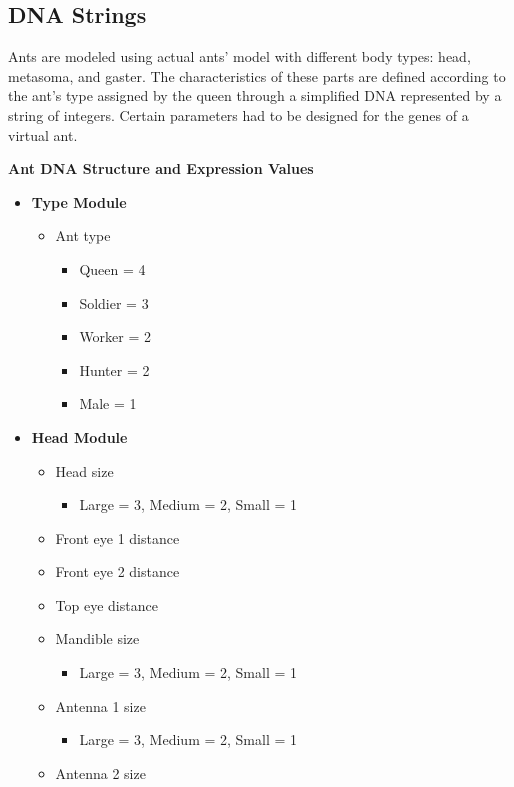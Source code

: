 \documentclass[titlepage, 12pt]{article}
\begin{document}
\subsection{DNA Strings}

Ants are modeled using actual ants' model with different body types: head, metasoma, and gaster. The characteristics of these parts are defined according to the ant's type assigned by the queen through a simplified DNA represented by a string of integers. Certain parameters had to be designed for the genes of a virtual ant. 

\begin{center}
{\bf Ant DNA Structure and Expression Values}
\end{center}

\begin{itemize}
\item  {\bf Type Module}
	\begin{itemize}
	\item Ant type
		\begin{itemize}
		\item Queen  = 4
		\item Soldier = 3
		\item Worker = 2
		\item Hunter = 2
		\item Male = 1
		\end{itemize}
	\end{itemize}
\item {\bf Head Module}
	\begin{itemize}
	\item Head size
		\begin{itemize}
		\item Large  = 3, Medium = 2, Small = 1
		\end{itemize}
	\item Front eye 1 distance
	\item Front eye 2 distance
	\item Top eye distance
	\item Mandible size
		\begin{itemize}
		\item Large  = 3, Medium = 2, Small = 1
		\end{itemize}
	\item Antenna 1 size
		\begin{itemize}
		\item Large  = 3, Medium = 2, Small = 1
		\end{itemize}
	\item Antenna 2 size

\end{itemize}
\end{itemize}
\end{document}
